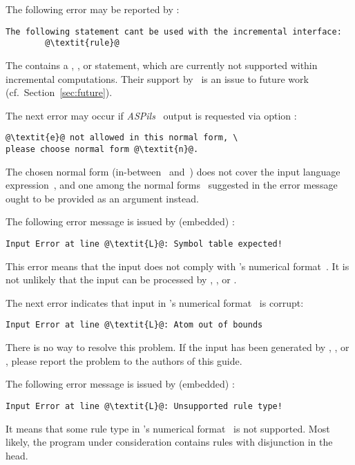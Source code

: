 The following error may be reported by \iclingo:
%
\begin{lstlisting}[numbers=none,escapechar=@]
The following statement cant be used with the incremental interface:
        @\textit{rule}@
\end{lstlisting}
%
The  contains a ,
, or  statement,
which are currently not supported within incremental computations.
Their support by \iclingo\ is an issue to future work
(cf.\ Section~\ref{sec:future}).

The next error may occur if \emph{ASPils}~\cite{gejaosscth08a}
output is requested via option :
%
\begin{lstlisting}[numbers=none,escapechar=@]
@\textit{e}@ not allowed in this normal form, \ 
please choose normal form @\textit{n}@.
\end{lstlisting}
%
The chosen normal form (in-between~ and~)
does not cover the input language expression~,
and one among the normal forms~ suggested
in the error message ought to be provided as an argument instead.

The following error message is issued by (embedded) \clasp:
%
\begin{lstlisting}[numbers=none,escapechar=@]
Input Error at line @\textit{L}@: Symbol table expected!
\end{lstlisting}
%
This error means that the input does not comply with \lparse's
numerical format~\cite{lparseManual}.
It is not unlikely that the input can be processed
by \gringo, \clingo, or \iclingo.

The next error indicates that input in
\lparse's numerical format~\cite{lparseManual} is corrupt:
%
\begin{lstlisting}[numbers=none,escapechar=@]
Input Error at line @\textit{L}@: Atom out of bounds
\end{lstlisting}
%
There is no way to resolve this problem.
If the input has been generated by \gringo, \clingo, or \iclingo,
please report the problem to the authors of this guide.

The following error message is issued by (embedded) \clasp:
%
\begin{lstlisting}[numbers=none,escapechar=@]
Input Error at line @\textit{L}@: Unsupported rule type!
\end{lstlisting}
%
It means that some rule type in \lparse's
numerical format~\cite{lparseManual} is not supported.
Most likely, the program under consideration contains
rules with disjunction in the head.

